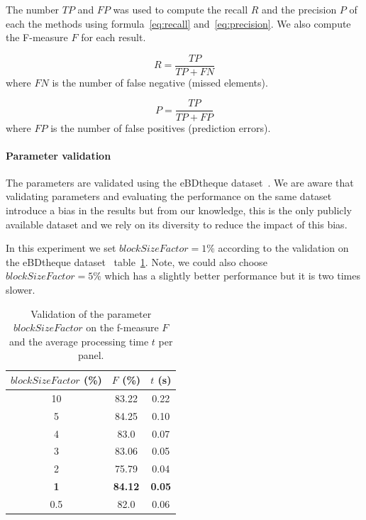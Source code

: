 The number $TP$ and $FP$ was used to compute the recall $R$ and the precision $P$ of each the methods using formula~\ref{eq:recall} and~\ref{eq:precision}.
We also compute the F-measure $F$ for each result.

\begin{equation}
\label{eq:recall}
  R = \frac{TP}{TP + FN}
\end{equation}
where $FN$ is the number of false negative (missed elements).

\begin{equation}
\label{eq:precision}
  P = \frac{TP}{TP + FP}
\end{equation}
where $FP$ is the number of false positives (prediction errors).

\paragraph{Parameter validation} %
\label{par:parameter_validation}
The parameters are validated using the eBDtheque dataset~\cite{Guerin2013}.
We are aware that validating parameters and evaluating the performance on the same dataset introduce a bias in the results but from our knowledge, this is the only publicly available dataset and we rely on its diversity to reduce the impact of this bias.

In this experiment we set $blockSizeFactor = 1\%$ according to the validation on the eBDtheque dataset~\cite{Guerin2013} table~\ref{tab:blockSizeFactor_validation}.
Note, we could also choose $blockSizeFactor = 5\%$ which has a slightly better performance but it is two times slower.
 

  \begin{table}[ht]
    \centering
    \caption{Validation of the parameter $blockSizeFactor$ on the f-measure $F$ and the average processing time $t$ per panel.}
    \begin{tabular}{|c|c|c|}
		\hline
		$blockSizeFactor$ (\%) & $F$ (\%) 	&$t$ (s)\\
		\hline 
		10 & 83.22 & 0.22 \\
		\hline
		5 & 84.25 & 0.10 \\
		\hline
		4 & 83.0 & 0.07 \\ 
		\hline
		3 & 83.06 & 0.05 \\
		\hline
		2 & 75.79 & 0.04 \\ 
		\hline
		\textbf{1} & \textbf{84.12} & \textbf{0.05} \\
		\hline
		0.5 & 82.0 & 0.06 \\
		\hline

	\end{tabular}
    \label{tab:blockSizeFactor_validation}
  \end{table}%

